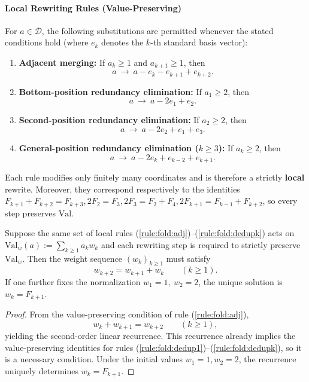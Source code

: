 \paragraph{Local Rewriting Rules (Value-Preserving)}
For $a\in\mathcal{D}$, the following substitutions are permitted whenever the stated conditions hold (where $e_k$ denotes the $k$-th standard basis vector):
\begin{enumerate}
  \renewcommand{\theenumi}{R\arabic{enumi}}
  \renewcommand{\labelenumi}{(\theenumi)}
  \item \label{rule:fold:adj}\textbf{Adjacent merging:} If $a_k\ge 1$ and $a_{k+1}\ge 1$, then
  \[
  a\ \to\ a-e_k-e_{k+1}+e_{k+2}.
  \]
  \item \label{rule:fold:dedup1}\textbf{Bottom-position redundancy elimination:} If $a_1\ge 2$, then
  \[
  a\ \to\ a-2e_1+e_2.
  \]
  \item \label{rule:fold:dedup2}\textbf{Second-position redundancy elimination:} If $a_2\ge 2$, then
  \[
  a\ \to\ a-2e_2+e_1+e_3.
  \]
  \item \label{rule:fold:dedupk}\textbf{General-position redundancy elimination ($k\ge 3$):} If $a_k\ge 2$, then
  \[
  a\ \to\ a-2e_k+e_{k-2}+e_{k+1}.
  \]
\end{enumerate}
Each rule modifies only finitely many coordinates and is therefore a strictly \textbf{local} rewrite. Moreover, they correspond respectively to the identities
\(
F_{k+1}+F_{k+2}=F_{k+3},
2F_2=F_3,
2F_3=F_2+F_4,
2F_{k+1}=F_{k-1}+F_{k+2}
\), so every step preserves $\mathrm{Val}$.

\begin{lemma}\label{lem:fold-local-weight-rigidity-fibonacci}
Suppose the same set of local rules \textup{(\ref{rule:fold:adj})--(\ref{rule:fold:dedupk})} acts on
\(
\mathrm{Val}_w(a):=\sum_{k\ge 1}a_k w_k
\)
and each rewriting step is required to strictly preserve \(\mathrm{Val}_w\).
Then the weight sequence \((w_k)_{k\ge 1}\) must satisfy
\[
w_{k+2}=w_{k+1}+w_k\qquad(k\ge 1).
\]
If one further fixes the normalization \(w_1=1,\ w_2=2\), the unique solution is \(w_k=F_{k+1}\).
\end{lemma}

\begin{proof}
From the value-preserving condition of rule \textup{(\ref{rule:fold:adj})},
\[
w_k+w_{k+1}=w_{k+2}\qquad(k\ge 1),
\]
yielding the second-order linear recurrence.
This recurrence already implies the value-preserving identities for rules \textup{(\ref{rule:fold:dedup1})--(\ref{rule:fold:dedupk})}, so it is a necessary condition.
Under the initial values \(w_1=1,w_2=2\), the recurrence uniquely determines \(w_k=F_{k+1}\).
\end{proof}

